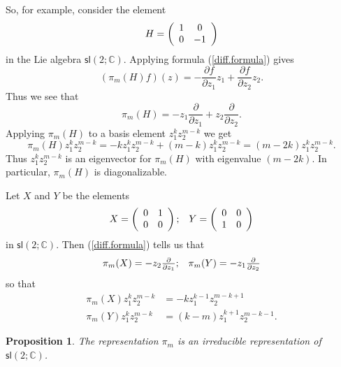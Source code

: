 \documentclass[12pt]{amsbook}
\theoremstyle{plain}
\newtheorem{proposition}[theorem]{Proposition}
\numberwithin{equation}{chapter}
\numberwithin{theorem}{chapter}
\begin{document}
So, for example, consider the element
\[
H=\left(
\begin{array}
[c]{cc}%
1 & 0\\
0 & -1
\end{array}
\right)
\]
in the Lie algebra $\mathsf{sl}(2;\mathbb{C})$. Applying formula
(\ref{diff.formula}) gives
\[
\left(  \pi_{m}(H)f\right)  (z)=-\frac{\partial f}{\partial z_{1}}z_{1}%
+\frac{\partial f}{\partial z_{2}}z_{2}\text{.}%
\]
Thus we see that
\begin{equation}
\pi_{m}(H)=-z_{1}\frac\partial{\partial z_{1}}+z_{2}\frac\partial{\partial
z_{2}}\text{.}\label{pi.h}%
\end{equation}
Applying $\pi_{m}(H)$ to a basis element $z_{1}^{k}z_{2}^{m-k}$ we get
\[
\pi_{m}(H)z_{1}^{k}z_{2}^{m-k}=-kz_{1}^{k}z_{2}^{m-k}+(m-k)z_{1}^{k}%
z_{2}^{m-k}=(m-2k)z_{1}^{k}z_{2}^{m-k}\text{.}%
\]
Thus $z_{1}^{k}z_{2}^{m-k}$ is an eigenvector for $\pi_{m}(H)$ with eigenvalue
$(m-2k)$. In particular, $\pi_{m}(H)$ is diagonalizable.

Let $X$ and $Y$ be the elements
\[%
\begin{array}
[c]{cc}%
X=\left(
\begin{array}
[c]{cc}%
0 & 1\\
0 & 0
\end{array}
\right)  ; & Y=\left(
\begin{array}
[c]{cc}%
0 & 0\\
1 & 0
\end{array}
\right)
\end{array}
\]
in $\mathsf{sl}(2;\mathbb{C})$. Then (\ref{diff.formula}) tells us that
\[%
\begin{array}
[c]{cc}%
\pi_{m}(X)=-z_{2}\frac{\partial}{\partial z_{1}}; & \pi_{m}(Y)=-z_{1}%
\frac{\partial}{\partial z_{2}}%
\end{array}
\]
so that
\begin{align}
\pi_{m}(X)z_{1}^{k}z_{2}^{m-k}  & =-kz_{1}^{k-1}z_{2}^{m-k+1}\nonumber\\
\pi_{m}(Y)z_{1}^{k}z_{2}^{m-k}  & =(k-m)z_{1}^{k+1}z_{2}^{m-k-1}%
\text{.}\label{poly.act}%
\end{align}

\begin{proposition}
\label{poly.irred}The representation $\pi_{m}$ is an irreducible
representation of $\mathsf{sl}(2;\mathbb{C})$.
\end{proposition}
\end{document}
